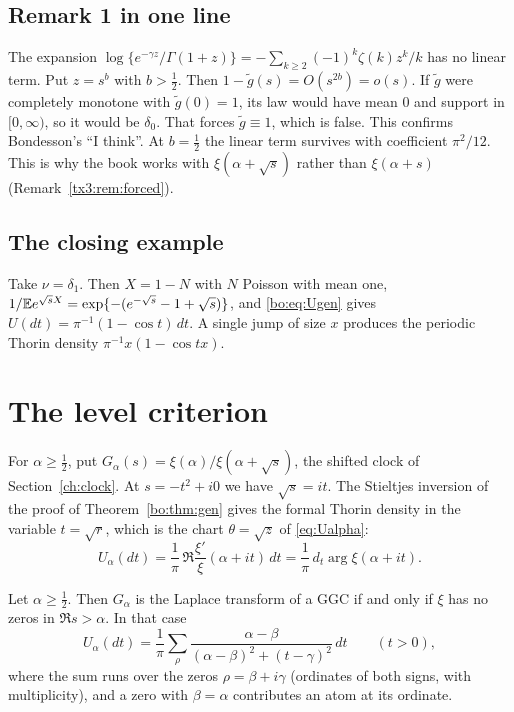 \subsection{Remark 1 in one line}

The expansion $\log\{e^{-\gamma z}/\Gamma(1+z)\}=-\sum_{k\ge2}(-1)^k\zeta(k)z^k/k$ has no linear term. Put $z=s^b$ with $b>\frac12$. Then $1-\tilde g(s)=O(s^{2b})=o(s)$. If $\tilde g$ were completely monotone with $\tilde g(0)=1$, its law would have mean $0$ and support in $[0,\infty)$, so it would be $\delta_0$. That forces $\tilde g\equiv1$, which is false. This confirms Bondesson's ``I think''. At $b=\frac12$ the linear term survives with coefficient $\pi^2/12$. This is why the book works with $\xi(\alpha+\sqrt s)$ rather than $\xi(\alpha+s)$ (Remark~\ref{tx3:rem:forced}).

\subsection{The closing example}

Take $\nu=\delta_1$. Then $X=1-N$ with $N$ Poisson with mean one, $1/\mathbb{E} e^{\sqrt sX}=\exp\{-(e^{-\sqrt s}-1+\sqrt s)\}$, and \eqref{bo:eq:Ugen} gives $U(dt)=\pi^{-1}(1-\cos t)\,dt$. A single jump of size $x$ produces the periodic Thorin density $\pi^{-1}x(1-\cos tx)$.

\section{The level criterion}\label{bo:sec:level}

For $\alpha\ge\frac12$, put $G_\alpha(s)=\xi(\alpha)/\xi(\alpha+\sqrt s)$, the shifted clock of Section~\ref{ch:clock}. At $s=-t^2+i0$ we have $\sqrt s=it$. The Stieltjes inversion of the proof of Theorem~\ref{bo:thm:gen} gives the formal Thorin density in the variable $t=\sqrt r$, which is the chart $\theta=\sqrt z$ of \eqref{eq:Ualpha}:
\begin{equation}\label{bo:eq:Ualpha}
U_\alpha(dt)=\frac1\pi\,\Re\frac{\xi'}{\xi}(\alpha+it)\,dt=\frac1\pi\,d_t\arg\xi(\alpha+it).
\end{equation}

\begin{theorem}\label{bo:thm:level}
Let $\alpha\ge\frac12$. Then $G_\alpha$ is the Laplace transform of a GGC if and only if $\xi$ has no zeros in $\Re s>\alpha$. In that case
\[
U_\alpha(dt)=\frac1\pi\sum_\rho\frac{\alpha-\beta}{(\alpha-\beta)^2+(t-\gamma)^2}\,dt\qquad(t>0),
\]
where the sum runs over the zeros $\rho=\beta+i\gamma$ (ordinates of both signs, with multiplicity), and a zero with $\beta=\alpha$ contributes an atom at its ordinate.
\end{theorem}

